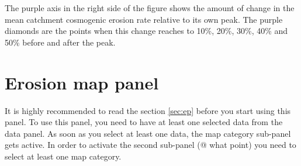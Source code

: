 \documentclass[11pt,a4paper,titlepage]{report}
\begin{document}
The purple axis in the right side of the figure shows the amount of change in the mean catchment cosmogenic erosion rate relative to its own peak. The purple diamonds are the points when this change reaches to 10\%, 20\%, 30\%, 40\% and 50\% before and after the peak.\\

\section{Erosion map panel}
It is highly recommended to read the section \ref{sec:ep} before you start using this panel. To use this panel, you need to have at least one selected data from the data panel. As soon as you select at least one data, the map category sub-panel gets active. In order to activate the second sub-panel (@ what point) you need to select at least one map category.\\
\end{document}
